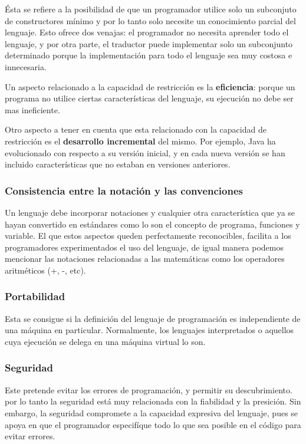 \documentclass{article}
\begin{document}
\'Esta se refiere a la posibilidad de que un programador utilice solo un subconjuto de constructores m\'inimo y por lo tanto solo necesite un conocimiento parcial del lenguaje. Esto ofrece dos venajas: el programador no necesita aprender todo el lenguaje, y por otra parte, el traductor puede implementar solo un subconjunto determinado porque la implementaci\'on para todo el lenguaje sea muy costosa e innecesaria.

Un aspecto relacionado a la capacidad de restricci\'on es la \textbf{eficiencia}: porque un programa no utilice ciertas caracter\'isticas del lenguaje, su ejecuci\'on no debe ser mas ineficiente.

Otro aspecto a tener en cuenta que esta relacionado con la capacidad de restricci\'on es el \textbf{desarrollo incremental} del mismo. Por ejemplo, Java ha evolucionado con respecto a su versi\'on inicial, y en cada nueva versi\'on se han incluido caracter\'isticas que no estaban en versiones anteriores.

\subsubsection{Consistencia entre la notaci\'on y las convenciones}

Un lenguaje debe incorporar notaciones y cualquier otra caracter\'istica que ya se hayan convertido en est\'andares como lo son el concepto de programa, funciones y variable. El que estos aspectos queden perfectamente reconocibles, facilita a los programadores experimentados el uso del lenguaje, de igual manera podemos mencionar las notaciones relacionadas a las matem\'aticas como los operadores aritm\'eticos (+, -, etc).

\subsubsection{Portabilidad}

Esta se consigue si la definici\'on del lenguaje de programaci\'on es independiente de una m\'aquina en particular. Normalmente, los lenguajes interpretados o aquellos cuya ejecuci\'on se delega en una m\'aquina virtual lo son.

\subsubsection{Seguridad}

Este pretende evitar los errores de programaci\'on, y permitir su descubrimiento. por lo tanto la seguridad est\'a muy relacionada con la fiabilidad y la presici\'on. Sin embargo, la seguridad compromete a la capacidad expresiva del lenguaje, pues se apoya en que el programador especif\'ique todo lo que sea posible en el c\'odigo para evitar errores.
\end{document}
